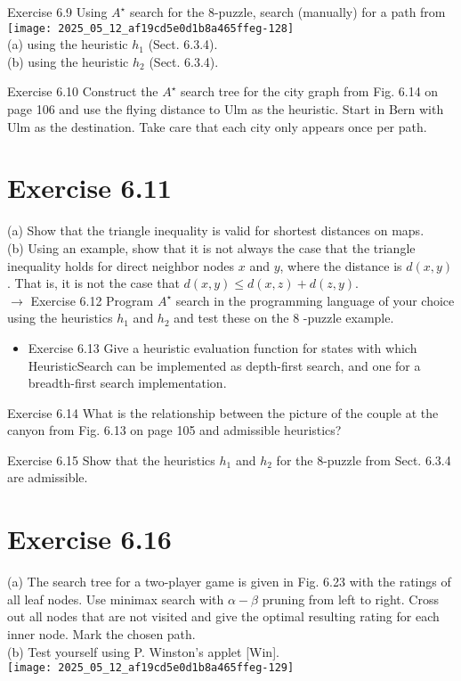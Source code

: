\documentclass[10pt]{article}
\begin{document}
Exercise 6.9 Using $A^{\star}$ search for the 8-puzzle, search (manually) for a path from\\
\texttt{[image: 2025\_05\_12\_af19cd5e0d1b8a465ffeg-128]}\\
(a) using the heuristic $h_{1}$ (Sect. 6.3.4).\\
(b) using the heuristic $h_{2}$ (Sect. 6.3.4).

Exercise 6.10 Construct the $A^{\star}$ search tree for the city graph from Fig. 6.14 on page 106 and use the flying distance to Ulm as the heuristic. Start in Bern with Ulm as the destination. Take care that each city only appears once per path.

\section*{Exercise 6.11}
(a) Show that the triangle inequality is valid for shortest distances on maps.\\
(b) Using an example, show that it is not always the case that the triangle inequality holds for direct neighbor nodes $x$ and $y$, where the distance is $d(x, y)$. That is, it is not the case that $d(x, y) \leq d(x, z)+d(z, y)$.\\
$\rightarrow$ Exercise 6.12 Program $A^{\star}$ search in the programming language of your choice using the heuristics $h_{1}$ and $h_{2}$ and test these on the 8 -puzzle example.

\begin{itemize}
  \item Exercise 6.13 Give a heuristic evaluation function for states with which HeuristicSearch can be implemented as depth-first search, and one for a breadth-first search implementation.
\end{itemize}

Exercise 6.14 What is the relationship between the picture of the couple at the canyon from Fig. 6.13 on page 105 and admissible heuristics?

Exercise 6.15 Show that the heuristics $h_{1}$ and $h_{2}$ for the 8-puzzle from Sect. 6.3.4 are admissible.

\section*{Exercise 6.16}
(a) The search tree for a two-player game is given in Fig. 6.23 with the ratings of all leaf nodes. Use minimax search with $\alpha-\beta$ pruning from left to right. Cross out all nodes that are not visited and give the optimal resulting rating for each inner node. Mark the chosen path.\\[0pt]
(b) Test yourself using P. Winston's applet [Win].\\
\texttt{[image: 2025\_05\_12\_af19cd5e0d1b8a465ffeg-129]}
\end{document}
